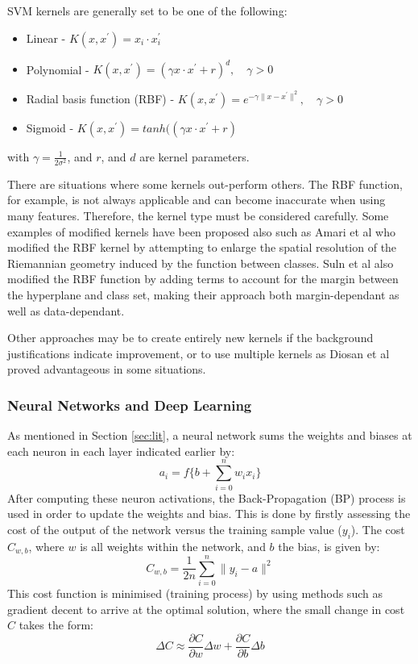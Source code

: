 \documentclass[fleqn,twoside]{article}
\begin{document}
SVM kernels are generally set to be one of the following:

\begin{itemize}
	\item Linear - $K(x, x^\prime) = x_i \cdot x_i^\prime$
	\item Polynomial - $K(x, x^\prime) = (\gamma x \cdot x^\prime + r) ^d, \quad \gamma > 0 \quad$
	\item Radial basis function (RBF) - $K(x, x^\prime) = e^{-\gamma\|x-x^\prime\|^2},  \quad \gamma > 0 \quad$
	\item Sigmoid - $K(x, x^\prime) = tanh((\gamma x \cdot x^\prime + r)$
\end{itemize}

with $\gamma = \frac{1}{2\sigma^2}$, and $r$, and $d$ are kernel parameters. 

There are situations where some kernels out-perform others. The RBF function, for example, is not always applicable and can become inaccurate when using many features. Therefore, the kernel type must be considered carefully. Some examples of modified kernels have been proposed also such as Amari et al \cite{amari} who modified the RBF kernel by attempting to enlarge the spatial resolution of the Riemannian geometry induced by the function between classes. Suln et al \cite{suln} also modified the RBF function by adding terms to account for the margin between the hyperplane and class set, making their approach both margin-dependant as well as data-dependant. 

Other approaches may be to create entirely new kernels if the background justifications indicate improvement, or to use multiple kernels as Diosan et al \cite{diosan} proved advantageous in some situations.



\subsubsection{Neural Networks and Deep Learning}

As mentioned in Section \ref{sec:lit}, a neural network sums the weights and biases at each neuron in each layer indicated earlier by: 
\begin{equation}
a_i = f\bigg\{b + \sum_{i=0}^{n} w_i x_i \bigg\}	
\end{equation}
After computing these neuron activations, the Back-Propagation (BP) process is used in order to update the weights and bias. This is done by firstly assessing the cost of the output of the network versus the training sample value ($y_i$). The cost $C_{w,b}$, where $w$ is all weights within the network, and $b$ the bias, is given by:
\begin{equation}
C_{w,b} = \frac{1}{2n} \sum_{i=0}^{n} \|y_i - a\|^2	
\end{equation}
This cost function is minimised (training process) by using methods such as gradient decent to arrive at the optimal solution, where the small change in cost $C$ takes the form:
\begin{equation}
\Delta C \approx \frac{\partial C}{\partial w} \Delta w + \frac{\partial C}{\partial b} \Delta b	
\end{equation}
\end{document}

